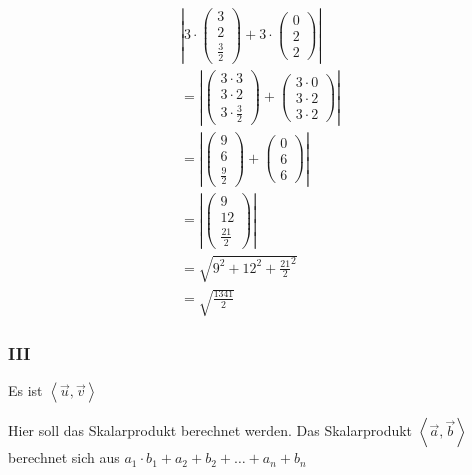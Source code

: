 \begin{align*}
    \left|3 \cdot \begin{pmatrix}
        3 \\ 2 \\ \frac{3}{2}
    \end{pmatrix} + 3 \cdot \begin{pmatrix}
        0 \\ 2 \\ 2
    \end{pmatrix}\right| \\
    = \left|\begin{pmatrix}
        3 \cdot 3 \\ 3 \cdot 2 \\ 3 \cdot \frac{3}{2}
    \end{pmatrix} + \begin{pmatrix}
        3 \cdot 0 \\ 3 \cdot 2 \\ 3 \cdot 2
    \end{pmatrix}\right| \\
    = \left|\begin{pmatrix}
        9 \\ 6 \\ \frac{9}{2}
    \end{pmatrix} + \begin{pmatrix}
        0 \\ 6 \\ 6
    \end{pmatrix}\right| \\
    = \left|\begin{pmatrix}
        9 \\ 12 \\ \frac{21}{2}
    \end{pmatrix}\right| \\
    = \sqrt{9^2 + 12^2 + \frac{21}{2}^2} \\
    = \sqrt{\frac{1341}{2}}
\end{align*}

\subsubsection{III}
Es ist $\left\langle\vec{u}, \vec{v}\right\rangle$

Hier soll das Skalarprodukt berechnet werden. Das Skalarprodukt $\left\langle\vec{a}, \vec{b}\right\rangle$
berechnet sich aus $a_1 \cdot b_1 + a_2 + b_2 + \dots + a_n + b_n$

